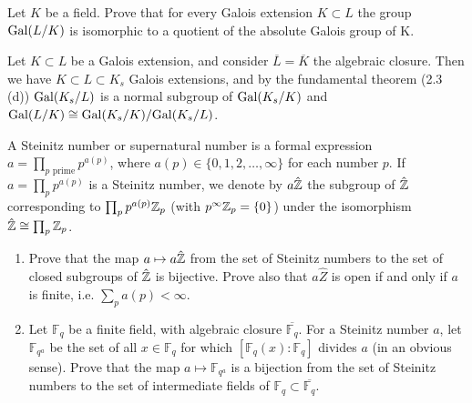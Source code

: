 \begin{ex}
	
\end{ex}


\begin{ex}
	Let $K$ be a field. Prove that for every Galois extension $K \subset L$ the group $\mathrm{Gal}(L/K)$ is isomorphic to a quotient of the absolute Galois group of K.
\end{ex}

\begin{sol}
	Let $K \subset L$ be a Galois extension, and consider $\overline{L} = \overline{K}$ the algebraic closure. Then we have $K \subset L \subset K_s$ Galois extensions, and by the fundamental theorem (2.3 (d)) $\mathrm{Gal}(K_s/L)$ is a normal subgroup of $\mathrm{Gal}(K_s/K)$ and $\mathrm{Gal}(L/K) \cong \mathrm{Gal}(K_s/K)/\mathrm{Gal}(K_s/L)$.
\end{sol}

\begin{ex}
	A Steinitz number or supernatural number is a formal expression $a = \prod_{p \text{ prime}} p^{a(p)}$, where $a(p) \in \{0,1,2, \dots , \infty\}$ for each number $p$. If $a = \prod_{p}p^{a(p)}$ is a Steinitz number, we denote by $a\hat{\mathbb{Z}}$ the subgroup of $\hat{\mathbb{Z}}$ corresponding to $\prod_p p^{a(p)}\mathbb{Z}_p$ (with $p^{\infty}\mathbb{Z}_p = \{0\}$) under the isomorphism $\hat{\mathbb{Z}} \cong \prod_p \mathbb{Z}_p$.
	\begin{enumerate}[label=\alph*)]
		\item Prove that the map $a \mapsto a\hat{\mathbb{Z}}$ from the set of Steinitz numbers to the set of closed subgroups of $\hat{\mathbb{Z}}$ is bijective. Prove also that $a\hat{Z}$ is open if and only if $a$ is finite, i.e. $\sum_p a(p) < \infty$.

		\item Let $\mathbb{F}_q$ be a finite field, with algebraic closure $\overline{\mathbb{F}_q}$. For a Steinitz number $a$, let $\mathbb{F}_{q^a}$ be the set of all $x \in \mathbb{F}_q$ for which $[\mathbb{F}_q(x):\mathbb{F}_q]$ divides $a$ (in an obvious sense). Prove that the map $a \mapsto \mathbb{F}_{q^a}$ is a bijection from the set of Steinitz numbers to the set of intermediate fields of $\mathbb{F}_q \subset \overline{\mathbb{F}_q}$.
	\end{enumerate}
\end{ex}

